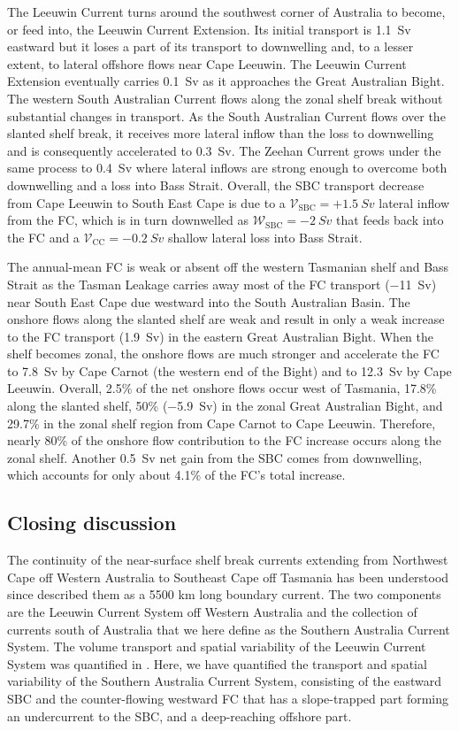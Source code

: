 \documentclass[preprint,3p,review,12pt]{elsarticle}
\newcommand{\sub}[1]{_{\text{#1}}}
\begin{document}
The Leeuwin Current turns around the southwest corner of Australia
to become, or feed into, the Leeuwin Current Extension\@.
Its initial transport is \SI{1.1}{Sv} eastward
but it
loses a part of its transport to downwelling
and, to a lesser extent, to lateral offshore flows near Cape Leeuwin. The Leeuwin Current Extension eventually carries \SI{0.1}{Sv} as it approaches the Great Australian Bight.
The western South Australian Current flows along the zonal shelf break
without substantial changes in transport.
As the South Australian Current flows over the slanted shelf break, it receives more lateral inflow than the loss to downwelling and is consequently accelerated to \SI{0.3}{Sv}.
The Zeehan Current grows under the same process to \SI{0.4}{Sv} where lateral inflows are strong enough to overcome both downwelling
and a loss into Bass Strait.
Overall, the SBC transport
decrease from Cape Leeuwin to South East Cape
is due to
a $\mathcal{V}\sub{SBC} = +\SI{1.5}{Sv}$ lateral inflow 
from the FC, which is in turn downwelled as $\mathcal{W}\sub{SBC} = \SI{-2}{Sv}$ that feeds back into the FC and a $\mathcal{V}\sub{CC} = \SI{-0.2}{Sv}$ shallow lateral loss into Bass Strait.

The annual-mean FC is weak or absent
off the western Tasmanian shelf and Bass Strait
as the Tasman Leakage carries
away most of the FC transport (\SI{-11}{Sv})
near South East Cape due westward into the South Australian Basin. The onshore flows along the slanted shelf are weak and result
in only a weak increase to the FC transport (\SI{1.9}{Sv})
in the eastern Great Australian Bight. When the shelf becomes zonal, the onshore flows are much stronger and
accelerate the FC to
\SI{7.8}{Sv} by Cape Carnot
(the western end of the Bight)
and to \SI{12.3}{Sv} by Cape Leeuwin.
Overall, 2.5\% of the net onshore flows occur west of Tasmania, 17.8\% along the slanted shelf, 50\% (\SI{-5.9}{Sv})
in the zonal Great Australian Bight,
and 29.7\% in the zonal shelf region from Cape Carnot to Cape Leeuwin. Therefore, nearly 80\% of the onshore flow contribution to the FC increase occurs along the zonal shelf. Another \SI{+0.5}{Sv} net gain from the SBC comes from
downwelling, which
accounts for only about 4.1\% of the FC's total increase.


\subsection{Closing discussion}\label{Closing discussion}
The continuity of the near-surface shelf break currents extending from Northwest Cape off Western Australia to Southeast Cape off Tasmania has been understood since \citet{Ridgway2004} described them as a 5500 km long boundary current. The two components are the Leeuwin Current System off Western Australia and the collection of currents south of Australia that we here define as the Southern Australia Current System. The volume transport and spatial variability of the Leeuwin Current System was quantified in \citet{Furue2017}. Here, we have quantified the transport and spatial variability of the Southern Australia Current System, consisting of the eastward SBC and the counter-flowing westward FC that has a slope-trapped part forming an undercurrent to the SBC, and a deep-reaching offshore part. 
\end{document}
